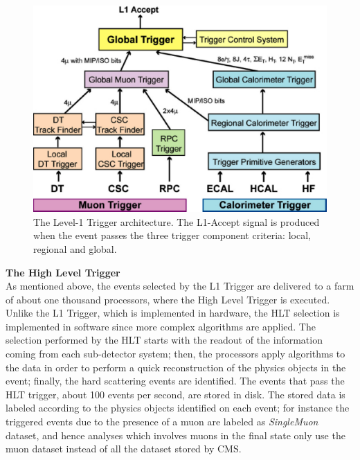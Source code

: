 \begin{center}
\begin{figure}[h]
\centering
\includegraphics[scale=0.35]{figuras/Chapter2/trigger}
\caption{The Level-1 Trigger architecture. The L1-Accept signal is produced when 
the event passes the three trigger component criteria: local, regional and global.}\label{figchp2:TriggerSystem}
\end{figure}
\end{center}

\textbf{The High Level Trigger}\\

\noindent As mentioned above, the events selected by 
the L1 Trigger are delivered to a farm of about one thousand 
processors, where the High Level Trigger is executed. Unlike 
the L1 Trigger, which is implemented in hardware, the 
HLT selection is implemented in software since more 
complex algorithms are applied. The selection performed by the 
HLT starts with the readout of the information coming 
from each sub-detector system; then, the
processors apply algorithms to the data in order to perform a quick 
reconstruction of the physics objects in the event; finally, the
hard scattering events are identified. The events that pass 
the HLT trigger, about 100 events per second, are stored in disk. The stored data 
is labeled according to the physics objects identified on each event; for 
instance the triggered events due to the presence of a muon are 
labeled as \textit{SingleMuon} dataset, and hence analyses which involves muons in the final state 
only use  the muon dataset instead of all the dataset stored by CMS.






